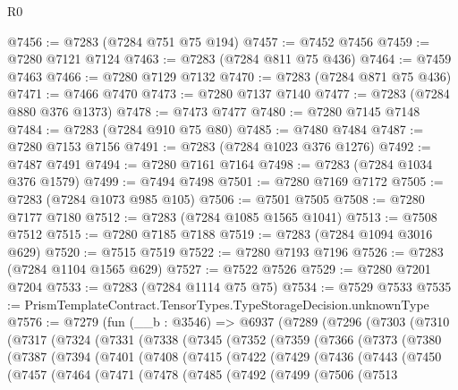 \begin{lexlean}{R0}
\begin{coremodule}
@7456 := @7283 (@7284 @751 @75 @194)
@7457 := @7452 @7456
@7459 := @7280 @7121 @7124
@7463 := @7283 (@7284 @811 @75 @436)
@7464 := @7459 @7463
@7466 := @7280 @7129 @7132
@7470 := @7283 (@7284 @871 @75 @436)
@7471 := @7466 @7470
@7473 := @7280 @7137 @7140
@7477 := @7283 (@7284 @880 @376 @1373)
@7478 := @7473 @7477
@7480 := @7280 @7145 @7148
@7484 := @7283 (@7284 @910 @75 @80)
@7485 := @7480 @7484
@7487 := @7280 @7153 @7156
@7491 := @7283 (@7284 @1023 @376 @1276)
@7492 := @7487 @7491
@7494 := @7280 @7161 @7164
@7498 := @7283 (@7284 @1034 @376 @1579)
@7499 := @7494 @7498
@7501 := @7280 @7169 @7172
@7505 := @7283 (@7284 @1073 @985 @105)
@7506 := @7501 @7505
@7508 := @7280 @7177 @7180
@7512 := @7283 (@7284 @1085 @1565 @1041)
@7513 := @7508 @7512
@7515 := @7280 @7185 @7188
@7519 := @7283 (@7284 @1094 @3016 @629)
@7520 := @7515 @7519
@7522 := @7280 @7193 @7196
@7526 := @7283 (@7284 @1104 @1565 @629)
@7527 := @7522 @7526
@7529 := @7280 @7201 @7204
@7533 := @7283 (@7284 @1114 @75 @75)
@7534 := @7529 @7533
@7535 := PrismTemplateContract.TensorTypes.TypeStorageDecision.unknownType
@7576 := @7279
    (fun (__b : @3546) =>
    @6937
      (@7289
        (@7296
          (@7303
            (@7310
              (@7317
                (@7324
                  (@7331
                    (@7338
                      (@7345
                        (@7352
                          (@7359
                            (@7366
                              (@7373
                                (@7380
                                  (@7387
                                    (@7394
                                      (@7401
                                        (@7408
                                          (@7415
                                            (@7422
                                              (@7429
                                                (@7436
                                                  (@7443
                                                    (@7450
                                                      (@7457
                                                        (@7464
                                                          (@7471
                                                            (@7478
                                                              (@7485
                                                                (@7492
                                                                  (@7499
                                                                    (@7506
                                                                      (@7513

\end{coremodule}
\end{lexlean}
